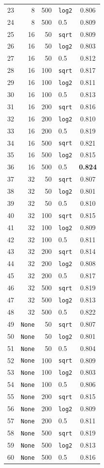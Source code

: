 \begin{longtable}{r r r l S[table-format=1.3, detect-weight, mode=text]}
    23 & 8 & 500 & \texttt{log2} & 0.806 \\
    24 & 8 & 500 & 0.5 & 0.809 \\
    25 & 16 & 50 & \texttt{sqrt} & 0.809 \\
    26 & 16 & 50 & \texttt{log2} & 0.803 \\
    27 & 16 & 50 & 0.5 & 0.812 \\
    28 & 16 & 100 & \texttt{sqrt} & 0.817 \\
    29 & 16 & 100 & \texttt{log2} & 0.811 \\
    30 & 16 & 100 & 0.5 & 0.813 \\
    31 & 16 & 200 & \texttt{sqrt} & 0.816 \\
    32 & 16 & 200 & \texttt{log2} & 0.810 \\
    33 & 16 & 200 & 0.5 & 0.819 \\
    34 & 16 & 500 & \texttt{sqrt} & 0.821 \\
    35 & 16 & 500 & \texttt{log2} & 0.815 \\
    36 & 16 & 500 & 0.5 & \bfseries 0.824 \\
    37 & 32 & 50 & \texttt{sqrt} & 0.807 \\
    38 & 32 & 50 & \texttt{log2} & 0.801 \\
    39 & 32 & 50 & 0.5 & 0.810 \\
    40 & 32 & 100 & \texttt{sqrt} & 0.815 \\
    41 & 32 & 100 & \texttt{log2} & 0.809 \\
    42 & 32 & 100 & 0.5 & 0.811 \\
    43 & 32 & 200 & \texttt{sqrt} & 0.814 \\
    44 & 32 & 200 & \texttt{log2} & 0.808 \\
    45 & 32 & 200 & 0.5 & 0.817 \\
    46 & 32 & 500 & \texttt{sqrt} & 0.819 \\
    47 & 32 & 500 & \texttt{log2} & 0.813 \\
    48 & 32 & 500 & 0.5 & 0.822 \\
    49 & \texttt{None} & 50 & \texttt{sqrt} & 0.807 \\
    50 & \texttt{None} & 50 & \texttt{log2} & 0.801 \\
    51 & \texttt{None} & 50 & 0.5 & 0.804 \\
    52 & \texttt{None} & 100 & \texttt{sqrt} & 0.809 \\
    53 & \texttt{None} & 100 & \texttt{log2} & 0.803 \\
    54 & \texttt{None} & 100 & 0.5 & 0.806 \\
    55 & \texttt{None} & 200 & \texttt{sqrt} & 0.815 \\
    56 & \texttt{None} & 200 & \texttt{log2} & 0.809 \\
    57 & \texttt{None} & 200 & 0.5 & 0.811 \\
    58 & \texttt{None} & 500 & \texttt{sqrt} & 0.819 \\
    59 & \texttt{None} & 500 & \texttt{log2} & 0.813 \\
    60 & \texttt{None} & 500 & 0.5 & 0.816 \\
\end{longtable}
